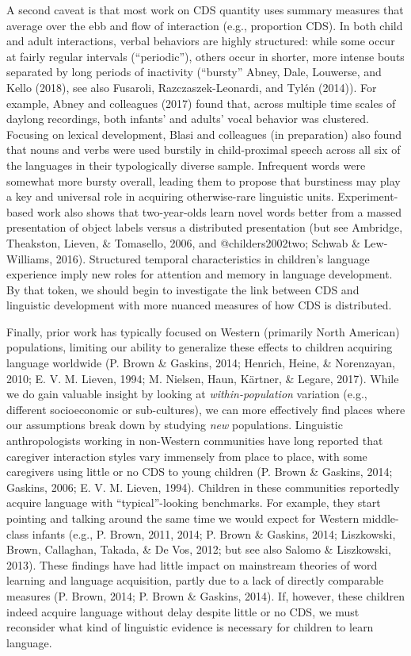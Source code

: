 \documentclass[floatsintext,man]{apa6}
\theoremstyle{definition}
\theoremstyle{definition}
\theoremstyle{definition}
\theoremstyle{remark}
\begin{document}
A second caveat is that most work on CDS quantity uses summary measures
that average over the ebb and flow of interaction (e.g., proportion
CDS). In both child and adult interactions, verbal behaviors are highly
structured: while some occur at fairly regular intervals
(\enquote{periodic}), others occur in shorter, more intense bouts
separated by long periods of inactivity (\enquote{bursty} Abney, Dale,
Louwerse, and Kello (2018), see also Fusaroli, Razczaszek-Leonardi, and
Tylén (2014)). For example, Abney and colleagues (2017) found that,
across multiple time scales of daylong recordings, both infants' and
adults' vocal behavior was clustered. Focusing on lexical development,
Blasi and colleagues (in preparation) also found that nouns and verbs
were used burstily in child-proximal speech across all six of the
languages in their typologically diverse sample. Infrequent words were
somewhat more bursty overall, leading them to propose that burstiness
may play a key and universal role in acquiring otherwise-rare linguistic
units. Experiment-based work also shows that two-year-olds learn novel
words better from a massed presentation of object labels versus a
distributed presentation (but see Ambridge, Theakston, Lieven, \&
Tomasello, 2006, and @childers2002two; Schwab \& Lew-Williams, 2016).
Structured temporal characteristics in children's language experience
imply new roles for attention and memory in language development. By
that token, we should begin to investigate the link between CDS and
linguistic development with more nuanced measures of how CDS is
distributed.

Finally, prior work has typically focused on Western (primarily North
American) populations, limiting our ability to generalize these effects
to children acquiring language worldwide (P. Brown \& Gaskins, 2014;
Henrich, Heine, \& Norenzayan, 2010; E. V. M. Lieven, 1994; M. Nielsen,
Haun, Kärtner, \& Legare, 2017). While we do gain valuable insight by
looking at \emph{within-population} variation (e.g., different
socioeconomic or sub-cultures), we can more effectively find places
where our assumptions break down by studying \emph{new} populations.
Linguistic anthropologists working in non-Western communities have long
reported that caregiver interaction styles vary immensely from place to
place, with some caregivers using little or no CDS to young children (P.
Brown \& Gaskins, 2014; Gaskins, 2006; E. V. M. Lieven, 1994). Children
in these communities reportedly acquire language with
\enquote{typical}-looking benchmarks. For example, they start pointing
and talking around the same time we would expect for Western
middle-class infants (e.g., P. Brown, 2011, 2014; P. Brown \& Gaskins,
2014; Liszkowski, Brown, Callaghan, Takada, \& De Vos, 2012; but see
also Salomo \& Liszkowski, 2013). These findings have had little impact
on mainstream theories of word learning and language acquisition, partly
due to a lack of directly comparable measures (P. Brown, 2014; P. Brown
\& Gaskins, 2014). If, however, these children indeed acquire language
without delay despite little or no CDS, we must reconsider what kind of
linguistic evidence is necessary for children to learn language.
\end{document}
